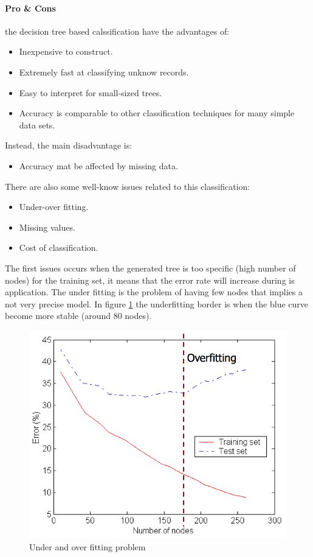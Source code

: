 \documentclass[12pt]{article}
\begin{document}
\paragraph{Pro \& Cons} the decision tree based calssification have the advantages of:
\begin{itemize}
  \item Inexpensive to construct.
  \item Extremely fast at classifying unknow records.
  \item Easy to interpret for small-sized trees.
  \item Accuracy is comparable to other classification techniques for many simple data sets.
\end{itemize}
Instead, the main disadvantage is:
\begin{itemize}
  \item Accuracy mat be affected by missing data.
\end{itemize}
There are also some well-know issues related to this classification:
\begin{itemize}
  \item Under-over fitting.
  \item Missing values.
  \item Cost of classification.
\end{itemize}
The first issues occurs when the generated tree is too specific (high number of nodes) for the training set, it means that the error rate will increase during is application. The under fitting is the problem of having few nodes that implies a not very precise model. In figure \ref{fig:under_over} the underfitting border is when the blue curve become more stable (around 80 nodes).
\begin{figure}[H]
  \includegraphics[width=\linewidth]{images/under_over.png}
  \caption{Under and over fitting problem}
  \label{fig:under_over}
\end{figure}
\end{document}

